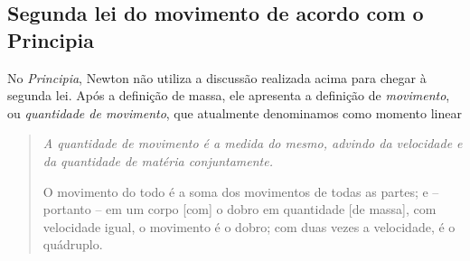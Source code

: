 \subsection{Segunda lei do movimento de acordo com o Principia}

No \emph{Principia}, Newton não utiliza a discussão realizada acima para chegar à segunda lei. Após a definição de massa, ele apresenta a definição de \emph{movimento}, ou \emph{quantidade de movimento}, que atualmente denominamos como momento linear
\begin{quote}
\emph{A quantidade de movimento é a medida do mesmo, advindo da velocidade e da quantidade de matéria conjuntamente.}

O movimento do todo é a soma dos movimentos de todas as partes; e -- portanto -- em um corpo [com] o dobro em quantidade [de massa], com velocidade igual, o movimento é o dobro; com duas vezes a velocidade, é o quádruplo.
\end{quote}

